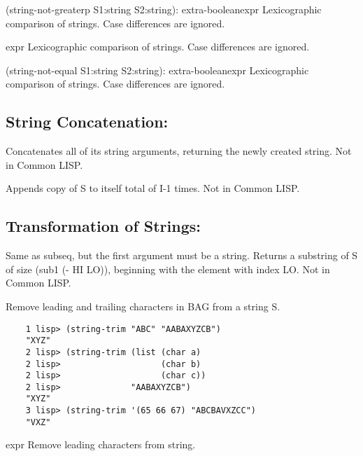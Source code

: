 {(string-not-greaterp S1:string S2:string): extra-boolean}{expr}
{    Lexicographic  comparison  of strings.  Case differences are ignored.
}

{expr}
{    Lexicographic comparison of strings.  Case  differences  are ignored.
}

{(string-not-equal S1:string S2:string): extra-boolean}{expr}
{    Lexicographic  comparison  of strings.  Case differences are ignored.
}
		
\subsection{String Concatenation:}

{    Concatenates all of  its  string  arguments,  returning  the
    newly created string.  Not in Common LISP.
}

{  Appends copy of S to itself total of I-1 times.  Not in Common LISP.
}\\

\subsection{Transformation of Strings:}

 {    Same as subseq, but the first argument  must  be 
a  string.
    Returns a substring of S of size (sub1 (- HI LO)), beginning
    with the element with index LO.  Not in Common LISP.
}

{    Remove  leading and trailing characters in BAG from a string
    S.
}
\begin{verbatim}
    1 lisp> (string-trim "ABC" "AABAXYZCB")
    "XYZ"
    2 lisp> (string-trim (list (char a)
    2 lisp>                    (char b)
    2 lisp>                    (char c))
    2 lisp>              "AABAXYZCB")
    "XYZ"
    3 lisp> (string-trim '(65 66 67) "ABCBAVXZCC")
    "VXZ"
\end{verbatim}

{expr}
{    Remove leading characters from string.
}

